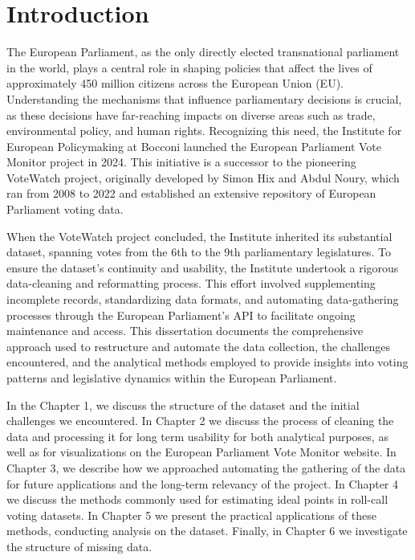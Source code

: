 \documentclass[a4paper,12pt]{report}
\begin{document}
    \nocite{*}




    \chapter{Introduction}

        The European Parliament, as the only directly elected transnational parliament in the world, plays a central
        role in shaping policies that affect the lives of approximately 450 million citizens across the European Union
        (EU). Understanding the mechanisms that influence parliamentary decisions is crucial, as these decisions have
        far-reaching impacts on diverse areas such as trade, environmental policy, and human rights. Recognizing this
        need, the Institute for European Policymaking at Bocconi launched the European Parliament Vote Monitor project
        in 2024. This initiative is a successor to the pioneering VoteWatch project, originally developed by Simon Hix
        and Abdul Noury, which ran from 2008 to 2022 and established an extensive repository of European Parliament
        voting data.

        When the VoteWatch project concluded, the Institute inherited its substantial dataset, spanning votes from the
        6th to the 9th parliamentary legislatures. To ensure the dataset's continuity and usability, the Institute
        undertook a rigorous data-cleaning and reformatting process. This effort involved supplementing incomplete
        records, standardizing data formats, and automating data-gathering processes through the European Parliament’s
        API to facilitate ongoing maintenance and access. This dissertation documents the comprehensive approach used to
        restructure and automate the data collection, the challenges encountered, and the analytical methods employed to
        provide insights into voting patterns and legislative dynamics within the European Parliament.

        In the Chapter 1, we discuss the structure of the dataset and the initial challenges we encountered. In
        Chapter 2 we discuss the process of cleaning the data and processing it for long term usability for both
        analytical purposes, as well as for visualizations on the European Parliament Vote Monitor website. In
        Chapter 3, we describe how we approached automating the gathering of the data for future applications and
        the long-term relevancy of the project. In Chapter 4 we discuss the methods commonly used for estimating
        ideal points in roll-call voting datasets. In Chapter 5 we present the practical applications of these
        methods, conducting analysis on the dataset. Finally, in Chapter 6 we investigate the structure of missing
        data.
\end{document}
